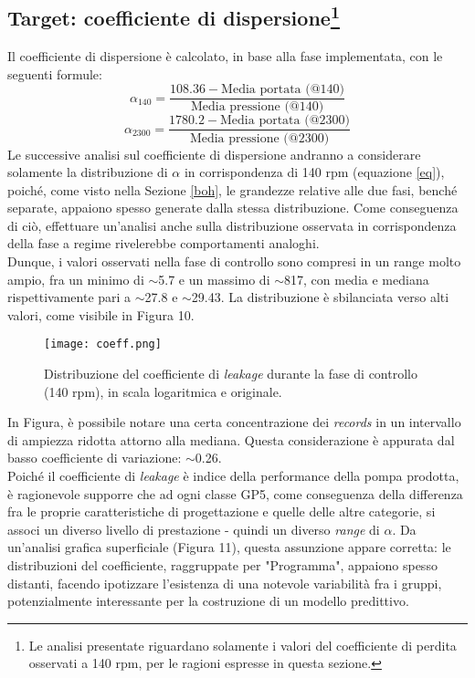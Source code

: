 \documentclass[fleqn,10pt]{SelfArx} %
\begin{document}
\subsection[Target: coefficiente di dispersione]{Target: coefficiente di dispersione\protect\footnote{Le analisi presentate riguardano solamente i valori del coefficiente di perdita osservati a 140 rpm, per le ragioni espresse in questa sezione.}}\label{Alpha}
Il coefficiente di dispersione è calcolato, in base alla fase implementata, con le seguenti formule:
\begin{equation}\label{eq}
    \alpha_{140}=\frac{108.36-\text{Media portata (@140)}}{\text{Media pressione (@140)}}
\end{equation}
\begin{equation}\label{eqaltra}
    \alpha_{2300}=\frac{1780.2-\text{Media portata (@2300)}}{\text{Media pressione (@2300)}}
\end{equation}
Le successive analisi sul coefficiente di dispersione andranno a considerare solamente la distribuzione di $\alpha$ in corrispondenza di 140 rpm (equazione \ref{eq}), poiché, come visto nella Sezione \ref{boh}, le grandezze relative alle due fasi, benché separate, appaiono spesso generate dalla stessa distribuzione. Come conseguenza di ciò, effettuare un'analisi anche sulla distribuzione osservata in corrispondenza della fase a regime rivelerebbe comportamenti analoghi.\\
Dunque, i valori osservati nella fase di controllo sono compresi in un range molto ampio, fra un minimo di $\sim$5.7 e un massimo di $\sim$817, con media e mediana rispettivamente pari a $\sim$27.8 e $\sim$29.43. La distribuzione è sbilanciata verso alti valori, come visibile in Figura 10.
\begin{figure}[h]
    \centering
    \texttt{[image: coeff.png]}
    \label{fig:em}
    \caption{Distribuzione del coefficiente di \textit{leakage} durante la fase di controllo (140 rpm), in scala logaritmica e originale.}
\end{figure}
In Figura, è possibile notare una certa concentrazione dei \textit{records} in un intervallo di ampiezza ridotta attorno alla mediana. Questa considerazione è appurata dal basso coefficiente di variazione: $\sim$0.26.\\
Poiché il coefficiente di \textit{leakage} è indice della performance della pompa prodotta, è ragionevole supporre che ad ogni classe GP5, come conseguenza della differenza fra le proprie caratteristiche di progettazione e quelle delle altre categorie, si associ un diverso livello di prestazione - quindi un diverso \textit{range} di $\alpha$. Da un'analisi grafica superficiale (Figura 11), questa assunzione appare corretta: le distribuzioni del coefficiente, raggruppate per "Programma", appaiono spesso distanti, facendo ipotizzare l'esistenza di una notevole variabilità fra i gruppi, potenzialmente interessante per la costruzione di un modello predittivo. 
\end{document}

